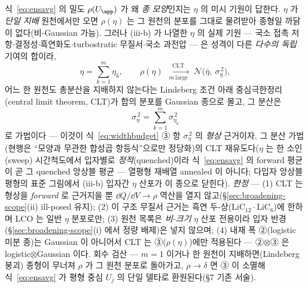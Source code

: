 식~\eqref{eq:ensavg} 의 밀도 $\rho(U_\app)$ 가 왜 \emph{종 모양}인지는 $\eta$ 의 미시 기원이 답한다.
$\eta$ 가 \emph{단일 지배} 원천에서만 오면 $\rho(\eta)$ 는 그 원천의 분포를 그대로 물려받아 종형일
까닭이 없다(비-Gaussian 가능). 그러나 (iii-b) 가 나열한 $\eta$ 의 실제 기원 --- 국소 접촉
저항$\cdot$결정성$\cdot$흑연화도$\cdot$turbostratic 무질서$\cdot$국소 과전압 --- 은 성격이 다른
\emph{다수의 독립} 기여의 합이라,
\begin{equation}
\eta=\sum_{k=1}^{m}\eta_k,\qquad
\rho(\eta)\ \xrightarrow[\;m\ \text{large}\;]{\text{CLT}}\ \mathcal N\!\big(\bar\eta,\ \sigma_\eta^{\,2}\big),
\label{eq:clt-bell}
\end{equation}
어느 한 원천도 총분산을 지배하지 않는다는 Lindeberg 조건 아래 중심극한정리(central limit
theorem, CLT)가 합의 분포를 Gaussian 종으로 몰고, 그 분산은
\begin{equation}
\sigma_\eta^{\,2}=\sum_{k=1}^{m}\sigma_{\eta_k}^{\,2}
\label{eq:clt-var}
\end{equation}
로 가법이다 --- 이것이 식~\eqref{eq:widthbudget} ③ 항 $\sigma_\eta^{\,2}$ 의 \emph{형상} 근거이자, 그
분산 가법(현행은 ``모양과 무관한 합성곱 항등식''으로만 정당화)의 CLT 재유도다($\eta$ 는 한 소인(sweep)
시간척도에서 입자별로 \emph{정적}(quenched)이라 식~\eqref{eq:ensavg} 의 forward 평균이 곧 그 quenched
앙상블 평균 --- 열평형 재배열 annealed 이 아니다; 다입자 앙상블 평형의 표준
그림\cite{dreyer2010,dreyer2011}에서 (iii-b) 입자간 $\eta$ 산포가 이 종으로 닫힌다). \emph{한정} ---
(1) CLT 는 형상을 \emph{forward} 로 근거지을 뿐 $\dd Q/\dd V\!\to\!\rho$ 역산을 열지
않고(\S\ref{sec:broadening-scope}(ii) ill-posed 유지); (2) 이 구조 무질서 근거는 흑연
두-상($\mathrm{LiC_{12}}\cdot\mathrm{LiC_6}$)에 한하며 LCO 는 일반 $\eta$ 분포로만; (3) 원천 목록은
\emph{비-크기} $\eta$ 산포 전용이라 입자 반경(\S\ref{sec:broadening-scope}(i) 에서 정량 배제)은 넣지
않으며; (4) 내재 폭 ②(logistic 미분 종)는 Gaussian 이 아니어서 CLT 는 ③($\rho(\eta)$)에만 적용된다
--- ②$\otimes$③ 은 logistic$\otimes$Gaussian 이다. 회수 검산 --- $m=1$ 이거나 한 원천이
지배하면(Lindeberg 붕괴) 종형이 무너져 $\rho$ 가 그 원천 분포로 돌아가고, $\rho\!\to\!\delta$ 면
③ 이 소멸해 식~\eqref{eq:ensavg} 가 평형 중심 $U_j$ 의 단일 델타로 환원된다(§7 기존 서술).



